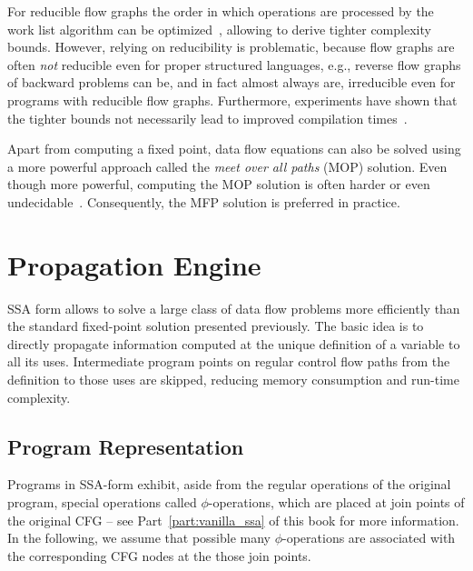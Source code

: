 For reducible flow graphs the order in which operations are processed by the
work list algorithm can be
optimized~\cite{novillo:bib:HU73,novillo:bib:KU76,novillo:bib:NNH99}, allowing
to derive tighter complexity bounds. However, relying on reducibility is
problematic, because flow graphs are often \emph{not} reducible even for proper
structured languages, e.g., reverse flow graphs of backward problems can be, and
in fact almost always are, irreducible even for programs with reducible flow
graphs. Furthermore, experiments have shown that the tighter bounds not
necessarily lead to improved compilation times~\cite{novillo:bib:CTK06}.

Apart from computing a fixed point, data flow equations can also be solved using
a more powerful approach called the \emph{meet over all paths} (MOP) solution.
Even though more powerful, computing the MOP solution is often harder or even
undecidable~\cite{novillo:bib:NNH99}. Consequently, the MFP solution is
preferred in practice.

\section{Propagation Engine}
\label{novillo:sec:prop-engine} 

SSA form allows to solve a large class of data flow problems more efficiently
than the standard fixed-point solution presented previously. The basic idea is
to directly propagate information computed at the unique definition of a
variable to all its uses. Intermediate program points on regular control flow
paths from the definition to those uses are skipped, reducing memory consumption
and run-time complexity.

\subsection{Program Representation}

Programs in SSA-form exhibit, aside from the regular operations of the original
program, special operations called $\phi$-operations, which are placed at join
points of the original CFG -- see Part~\ref{part:vanilla_ssa} of this book for
more information. In the following, we assume that possible many
$\phi$-operations are associated with the corresponding CFG nodes at the those
join points.

